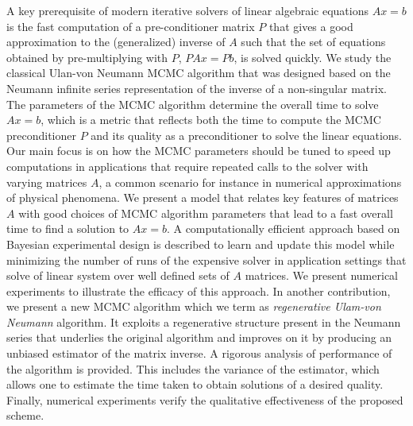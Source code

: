 \begin{talk}
A key prerequisite of modern iterative solvers of linear algebraic equations $Ax=b$ is the fast computation of a pre-conditioner matrix $P$ that gives a good approximation to the (generalized) inverse of $A$ such that the set of equations obtained by pre-multiplying with $P$, $PAx=Pb$, is solved quickly. 
We study the classical Ulan-von Neumann MCMC algorithm that was designed based on the Neumann infinite series representation of the inverse of a non-singular matrix. The parameters of the MCMC algorithm determine the overall time to solve $Ax=b$, which is a metric that 
reflects both the time to compute the MCMC preconditioner $P$ and its quality as a preconditioner to solve the linear equations. Our main focus is on how the MCMC parameters should be tuned to speed up computations in applications that require repeated calls to the solver with varying matrices $A$, a common scenario for instance in numerical approximations of physical phenomena. 
We present a model that relates key features of matrices $A$ with good choices of MCMC algorithm parameters that lead to a fast overall time to find a solution to $Ax=b$. A computationally efficient approach based on Bayesian experimental design is described to learn and update this model while minimizing the number of runs of the expensive solver in application settings that solve of linear system over well defined sets of $A$ matrices. We present numerical experiments to illustrate the efficacy of this approach.
In another contribution, we present a new MCMC algorithm which we term as \emph{regenerative Ulam-von Neumann} algorithm. It exploits a regenerative structure present in the Neumann series that underlies the original algorithm and improves on it by producing an unbiased estimator of the matrix inverse. A rigorous analysis of performance of the algorithm is provided. This includes the variance of the estimator, which allows one to estimate the time taken to obtain solutions of a desired quality. Finally, numerical experiments verify the qualitative effectiveness of the proposed scheme. 

\end{talk}

